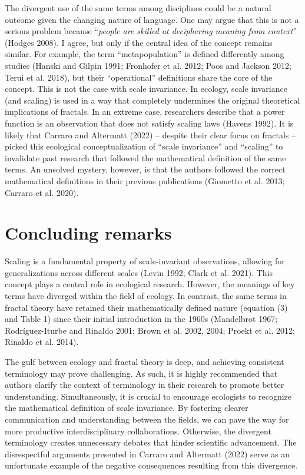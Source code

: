 \documentclass[
  12pt,
]{article}
\begin{document}
The divergent use of the same terms among disciplines could be a natural outcome given the changing nature of language. One may argue that this is not a serious problem because ``\emph{people are skilled at deciphering meaning from context}'' (Hodges 2008). I agree, but only if the central idea of the concept remains similar. For example, the term ``metapopulation'' is defined differently among studies (Hanski and Gilpin 1991; Fronhofer et al. 2012; Poos and Jackson 2012; Terui et al. 2018), but their ``operational'' definitions share the core of the concept. This is not the case with scale invariance. In ecology, scale invariance (and scaling) is used in a way that completely undermines the original theoretical implications of fractals. In an extreme case, researchers describe that a power function is an observation that does not satisfy scaling laws (Havens 1992). It is likely that Carraro and Altermatt (2022) -- despite their clear focus on fractals -- picked this ecological conceptualization of ``scale invariance'' and ``scaling'' to invalidate past research that followed the mathematical definition of the same terms. An unsolved mystery, however, is that the authors followed the correct mathematical definitions in their previous publications (Giometto et al. 2013; Carraro et al. 2020).

\hypertarget{concluding-remarks}{%
\section{Concluding remarks}\label{concluding-remarks}}

Scaling is a fundamental property of scale-invariant observations, allowing for generalizations across different scales (Levin 1992; Clark et al. 2021). This concept plays a central role in ecological research. However, the meanings of key terms have diverged within the field of ecology. In contrast, the same terms in fractal theory have retained their mathematically defined nature (equation (3) and Table 1) since their initial introduction in the 1960s (Mandelbrot 1967; Rodríguez-Iturbe and Rinaldo 2001; Brown et al. 2002, 2004; Proekt et al. 2012; Rinaldo et al. 2014).

The gulf between ecology and fractal theory is deep, and achieving consistent terminology may prove challenging. As such, it is highly recommended that authors clarify the context of terminology in their research to promote better understanding. Simultaneously, it is crucial to encourage ecologists to recognize the mathematical definition of scale invariance. By fostering clearer communication and understanding between the fields, we can pave the way for more productive interdisciplinary collaborations. Otherwise, the divergent terminology creates unnecessary debates that hinder scientific advancement. The disrespectful arguments presented in Carraro and Altermatt (2022) serve as an unfortunate example of the negative consequences resulting from this divergence.
\end{document}

